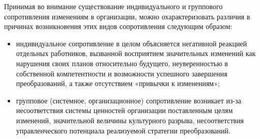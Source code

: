 Принимая во внимание существование индивидуального и группового сопротивления изменениям в организации, можно охарактеризовать различия в причинах возникновения этих видов сопротивления следующим образом:
\begin{itemize}
	\item индивидуальное сопротивление в целом объясняется негативной реакцией отдельных работников, вызванной восприятием значительных изменений как нарушения своих планов относительно будущего, неуверенностью в собственной компетентности и возможности успешного завершения преобразований, а также отсутствием «привычки к изменениям»;
\item групповое (системное, организационное) сопротивление возникает из-за несоответствия системы ценностей организации поставленным целям изменений, значительной величины культурного разрыва, несоответствия управленческого потенциала реализуемой стратегии преобразований.
\end{itemize}


















